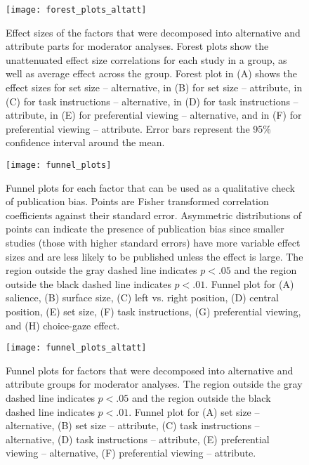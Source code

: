 
\clearpage


\begin{figure}%
\texttt{[image: forest\_plots\_altatt]}
\centering
\singlespace
\caption{Effect sizes of the factors that were decomposed into alternative and attribute parts for moderator analyses. Forest plots show the unattenuated effect size correlations for each study in a group, as well as average effect across the group. Forest plot in (A) shows the effect sizes for set size -- alternative, in (B) for set size -- attribute, in (C) for task instructions -- alternative, in (D) for task instructions -- attribute, in (E) for preferential viewing -- alternative, and in (F) for preferential viewing -- attribute. Error bars represent the 95\% confidence interval around the mean.}
\label{fig:forest_plots_altatt}
\end{figure}
\clearpage


\begin{figure}[!h]
\texttt{[image: funnel\_plots]}
\centering
\caption{Funnel plots for each factor that can be used as a qualitative check of publication bias. Points are Fisher transformed correlation coefficients against their standard error. Asymmetric distributions of points can indicate the presence of publication bias since smaller studies (those with higher standard errors) have more variable effect sizes and are less likely to be published unless the effect is large. The region outside the gray dashed line indicates $p < .05$ and the region outside the black dashed line indicates $p < .01$. Funnel plot for (A) salience, (B) surface size, (C) left vs. right position, (D) central position, (E) set size, (F) task instructions, (G) preferential viewing, and (H) choice-gaze effect.}
\label{fig:funnel_plots}
\end{figure}


\begin{figure}%
\texttt{[image: funnel\_plots\_altatt]}
\centering
\singlespace
\caption{Funnel plots for factors that were decomposed into alternative and attribute groups for moderator analyses. The region outside the gray dashed line indicates $p < .05$ and the region outside the black dashed line indicates $p < .01$. Funnel plot for (A) set size -- alternative, (B) set size -- attribute, (C) task instructions -- alternative, (D) task instructions -- attribute, (E) preferential viewing -- alternative, (F) preferential viewing -- attribute.}
\label{fig:funnel_plots_altatt}
\end{figure}
\clearpage




